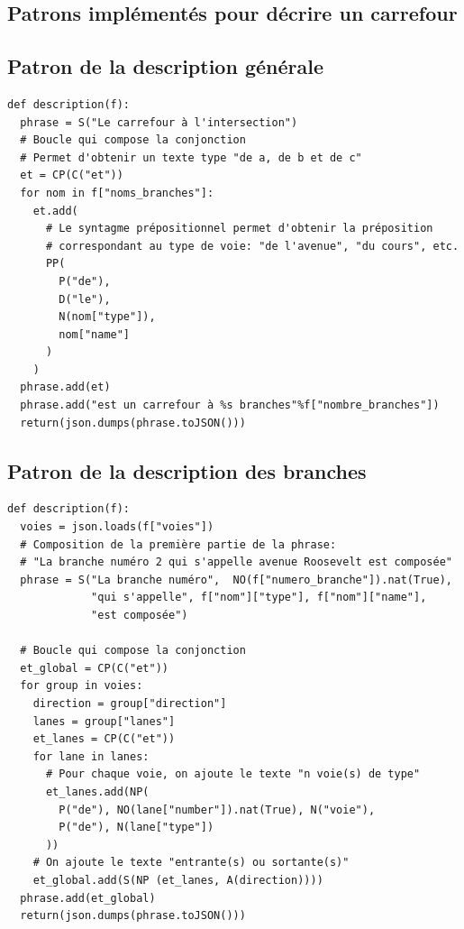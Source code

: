 \begin{appendix}

\chapter{Patrons implémentés pour décrire un carrefour}
\label{annexe:patrons}

\section*{Patron de la description générale}

\begin{verbatim}
def description(f):
  phrase = S("Le carrefour à l'intersection")
  # Boucle qui compose la conjonction
  # Permet d'obtenir un texte type "de a, de b et de c"
  et = CP(C("et"))
  for nom in f["noms_branches"]:
    et.add(
      # Le syntagme prépositionnel permet d'obtenir la préposition
      # correspondant au type de voie: "de l'avenue", "du cours", etc.
      PP(
        P("de"),
        D("le"),
        N(nom["type"]),
        nom["name"]
      )
    )
  phrase.add(et)
  phrase.add("est un carrefour à %s branches"%f["nombre_branches"])
  return(json.dumps(phrase.toJSON()))
\end{verbatim}

\section*{Patron de la description des branches}

\begin{verbatim}
def description(f):
  voies = json.loads(f["voies"])
  # Composition de la première partie de la phrase: 
  # "La branche numéro 2 qui s'appelle avenue Roosevelt est composée"
  phrase = S("La branche numéro",  NO(f["numero_branche"]).nat(True), 
             "qui s'appelle", f["nom"]["type"], f["nom"]["name"], 
             "est composée")
    
  # Boucle qui compose la conjonction
  et_global = CP(C("et"))
  for group in voies:
    direction = group["direction"]
    lanes = group["lanes"]
    et_lanes = CP(C("et"))
    for lane in lanes:
      # Pour chaque voie, on ajoute le texte "n voie(s) de type"
      et_lanes.add(NP( 
        P("de"), NO(lane["number"]).nat(True), N("voie"), 
        P("de"), N(lane["type"]) 
      ))
    # On ajoute le texte "entrante(s) ou sortante(s)"
    et_global.add(S(NP (et_lanes, A(direction))))
  phrase.add(et_global)
  return(json.dumps(phrase.toJSON()))
\end{verbatim}


\end{appendix}
